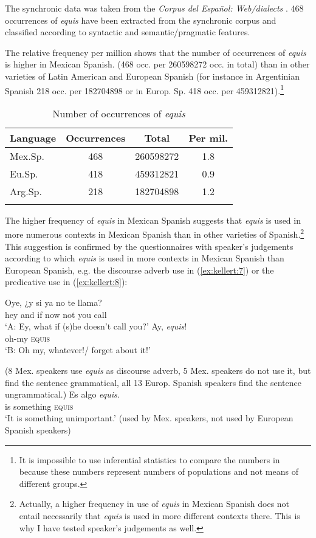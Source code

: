 \documentclass[output=paper]{langsci/langscibook}
\begin{document}
The synchronic data was taken from the \textit{Corpus del Español: Web\slash dialects} \citep{CDE}. 468 occurrences of \textit{equis} have been extracted from the synchronic corpus and classified according to syntactic and semantic/pragmatic features.

The relative frequency per million shows that the number of occurrences of \textit{equis} is higher in Mexican Spanish. (468 occ. per 260598272 occ. in total) than in other varieties of Latin American and European Spanish (for instance in Argentinian Spanish 218 occ. per 182704898 or in Europ. Sp. 418 occ. per 459312821).\footnote{It is impossible to use inferential statistics to compare the numbers in  because these numbers represent numbers of populations and not means of different groups.}

\begin{table}
\caption{Number of occurrences of \textit{equis}\label{tab:kellert:numbers}}
\begin{tabular}{lS[table-format=3.0]S[table-format=9.0]S[table-format=1.1]}
\lsptoprule
Language & {Occurrences} & {Total} & {Per mil.}\\\midrule
Mex.Sp. & 468 & 260598272 & 1.8\\
Eu.Sp.  & 418 & 459312821 & 0.9\\
Arg.Sp. & 218 & 182704898 & 1.2\\
\lspbottomrule
\end{tabular}
\end{table}

The higher frequency of \textit{equis} in Mexican Spanish suggests that \textit{equis} is used in more numerous contexts in Mexican Spanish than in other varieties of Spanish.\footnote{Actually, a higher frequency in use of \textit{equis} in Mexican Spanish does not entail necessarily that \textit{equis} is used in more different contexts there. This is why I have tested speaker’s judgements as well.}  This suggestion is confirmed by the questionnaires with speaker's judgements according to which \textit{equis} is used in more contexts in Mexican Spanish than European Spanish, e.g. the discourse adverb use in (\ref{ex:kellert:7}) or the predicative use in (\ref{ex:kellert:8}):

\ea\label{ex:kellert:7}
\begin{xlist}
\gll Oye, {¿}y si ya no te llama?\\
hey and if now not you call\\
\glt ‘A: Ey, what if (s)he doesn’t call you?'
Ay, \textit{equis}!\\
oh-my \textsc{equis}\\
\glt ‘B: Oh my, whatever!/ forget about it!’\\
\end{xlist}
(8 Mex. speakers use \textit{equis} as discourse adverb, 5 Mex. speakers do not use it, but find the sentence grammatical, all 13 Europ. Spanish speakers find the sentence ungrammatical.)
\ex \label{ex:kellert:8}
\gll Es algo \textit{equis}.\\
is something \textsc{equis}\\
\glt ‘It is something unimportant.’
(used by Mex. speakers, not used by European Spanish speakers)
\z
\end{document}
